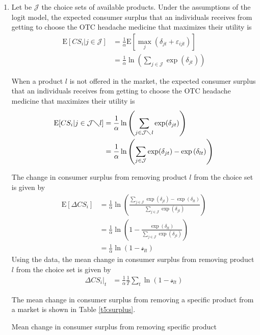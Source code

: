 \documentclass{article}
\newcommand{\E}{\text{E}}
\begin{document}
\begin{enumerate}
\begin{table}[H]
\centering
\caption{Mean own price elasticity for different product across specifications}\label{t4:elasticity}
\begin{threeparttable}

\end{threeparttable}
\end{table}

\item Let be $\mathcal{J}$ the choice sets of available products. Under the assumptions of the logit model, the expected consumer surplus that an individuals receives
from getting to choose the OTC headache medicine that maximizes their utility is
\begin{align*}
\E[CS_i|j\in \mathcal{J}]&=\frac{1}{\alpha} \E[\max_j (\delta_{jt}+\varepsilon_{ijt})]\\
&=\frac{1}{\alpha} \ln\left(\sum_{j\in \mathcal{J}}\exp(\delta_{jt})\right)
\end{align*}

When a product $l$ is not offered in the market, the expected consumer surplus that an individuals receives from getting to choose the OTC headache medicine that maximizes their utility is
\begin{align*}
    \E[CS_i|j\in \mathcal{J}\diagdown l]&=\frac{1}{\alpha} \ln\left(\sum_{j\in \mathcal{J}\diagdown l}\exp(\delta_{jt})\right)\\
    &=\frac{1}{\alpha} \ln\left(\sum_{j\in \mathcal{J}}\exp(\delta_{jt})-\exp{(\delta_{lt})}\right)
\end{align*}

The change in consumer surplus from removing product $l$ from the choice set is given by
\begin{align*}
    \E[\Delta CS_i]&=\frac{1}{\alpha} \ln\left(\frac{\sum_{j\in \mathcal{J}}\exp(\delta_{jt})-\exp{(\delta_{lt})}}{\sum_{j\in \mathcal{J}}\exp{(\delta_{jt})}}\right)\\
    &=\frac{1}{\alpha}\ln\left(1-\frac{\exp{(\delta_{lt})}}{\sum_{j\in \mathcal{J}}\exp{(\delta_{jt})}}\right)\\
    &=\frac{1}{\alpha}\ln\left(1-\mathcal{s}_{lt}\right)
\end{align*}
Using the data, the mean change in consumer surplus from removing product $l$ from the choice set is given by
\begin{align*}
    \Delta CS_i\vert_t&=\frac{1}{\alpha} \frac{1}{T}\sum_{t}\ln\left(1-\mathcal{s}_{lt}\right)
\end{align*}

The mean change in consumer surplus from removing a specific product from a market is shown in Table \ref{t5:surplus}.

\begin{table}[H]
\centering
\caption{Mean change in consumer surplus from removing specific product}\label{t5:surplus}
\begin{threeparttable}

\end{threeparttable}
\end{table}

\end{enumerate}
\end{document}
